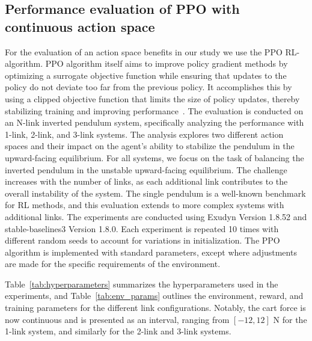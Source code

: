 \subsection{Performance evaluation of PPO with continuous action space} \label{subsec: Performance Evaluation of PPO with Discrete and Continuous Action Spaces}

For the evaluation of an action space benefits in our study we use the PPO RL-algorithm. PPO algorithm itself aims to improve policy gradient methods by optimizing a surrogate objective function while ensuring that updates to the policy do not deviate too far from the previous policy. It accomplishes this by using a clipped objective function that limits the size of policy updates, thereby stabilizing training and improving performance~\cite{schulman2017ppo}. The evaluation is conducted on an N-link inverted pendulum system, specifically analyzing the performance with 1-link, 2-link, and 3-link systems. The analysis explores two different action spaces and their impact on the agent's ability to stabilize the pendulum in the upward-facing equilibrium. 
For all systems, we focus on the task of balancing the inverted pendulum in the unstable upward-facing equilibrium. The challenge increases with the number of links, as each additional link contributes to the overall instability of the system. The single pendulum is a well-known benchmark for RL methods, and this evaluation extends to more complex systems with additional links.
The experiments are conducted using Exudyn Version 1.8.52 and stable-baselines3 Version 1.8.0. Each experiment is repeated 10 times with different random seeds to account for variations in initialization. The PPO algorithm is implemented with standard parameters, except where adjustments are made for the specific requirements of the environment.

Table~\ref{tab:hyperparameters} summarizes the hyperparameters used in the experiments, and Table~\ref{tab:env_params} outlines the environment, reward, and training parameters for the different link configurations. Notably, the cart force is now continuous and is presented as an interval, ranging from \([-12, 12]\) N for the 1-link system, and similarly for the 2-link and 3-link systems.

